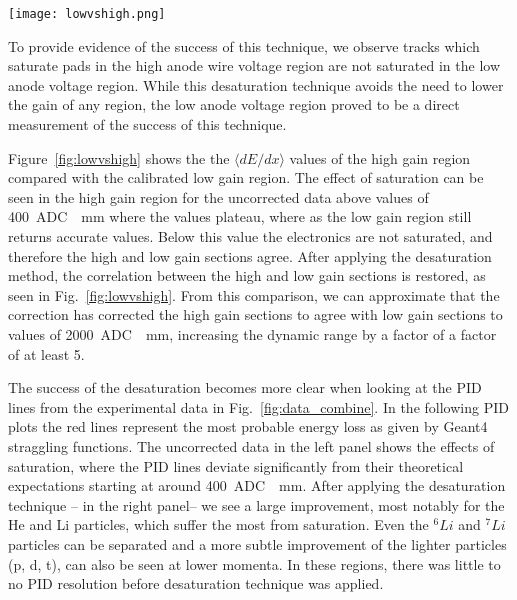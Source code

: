 \begin{figure*}[!htb]
\centering
\texttt{[image: lowvshigh.png]}
\caption{Uncorrected (left panel) and desaturated (right panel) collision data comparing the low gain region to the high gain anode regions of the TPC.}
\label{fig:lowvshigh}
\end{figure*}

To provide evidence of the success of this technique, we observe tracks which saturate pads in the high anode wire voltage region are not saturated in the low anode voltage region. While this desaturation technique avoids the need to lower the gain of any region, the low anode voltage region proved to be a direct measurement of the success of this technique.
 
Figure~\ref{fig:lowvshigh} shows the the $\langle dE/dx\rangle$ values of the high gain region compared with the calibrated low gain region. The effect of saturation can be seen in the high gain region for the uncorrected data above values of \SI{400}{ADC \per \milli\metre} where the values plateau, where as the low gain region still returns accurate values. Below this value the electronics are not saturated, and therefore the high and low gain sections agree. After applying the desaturation method, the correlation between the high and low gain sections is restored, as seen in Fig.~\ref{fig:lowvshigh}. From this comparison, we can approximate that the correction has corrected the high gain sections to agree with low gain sections to values of \SI{2000}{ADC \per \milli\metre}, increasing the dynamic range by a factor of a factor of at least 5.

The success of the desaturation becomes more clear when looking at the PID lines from the experimental data in Fig.~\ref{fig:data_combine}. In the following PID plots the red lines represent the most probable energy loss as given by Geant4 straggling functions. The uncorrected data in the left panel shows the effects of saturation, where the PID lines deviate significantly from their theoretical expectations starting at around \SI{400}{ADC \per \milli\metre}. After applying the desaturation technique -- in the right panel-- we see a large improvement, most notably for the He and Li particles, which suffer the most from saturation. Even the ${}^{6}Li$ and ${}^{7}Li$ particles can be separated and a more subtle improvement of the lighter particles (p, d, t), can also be seen at lower momenta. In these regions, there was little to no PID resolution before desaturation technique was applied.  


